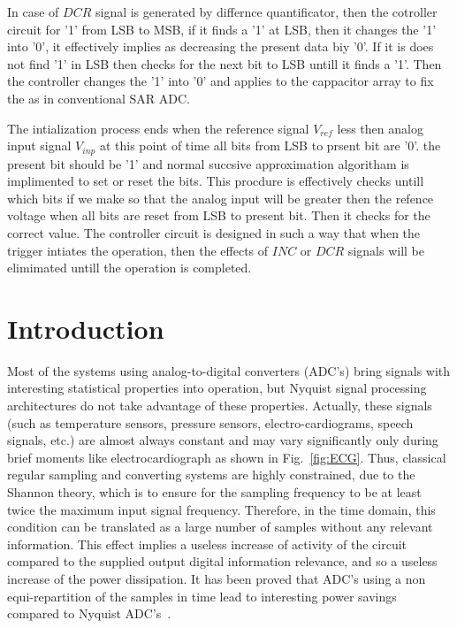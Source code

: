 	In case of $DCR$ signal is generated by differnce quantificator, then the cotroller circuit for '1' from LSB to MSB, if it finds a '1' at LSB, then it changes the '1' into '0', it effectively implies as decreasing the present data biy '0'. If it is does not find '1' in LSB then checks for the next bit to LSB untill it finds a '1'. Then the controller changes the '1' into '0' and applies to the cappacitor array to fix the as in conventional SAR ADC. \par

	The intialization process ends when the reference signal $V_{ref}$ less then analog input signal $V_{inp}$ at this point of time all bits from LSB to prsent bit are '0'. the present bit should be '1' and normal succsive approximation algoritham is implimented to set or reset the bits. This procdure is effectively checks untill which bits if we make so that the analog input will be greater then the refence voltage when all bits are reset from LSB to present bit. Then it checks for the correct value. The controller circuit is designed in such a way that when the trigger intiates the operation, then the effects of $INC$ or $DCR$ signals will be elimimated untill the operation is completed.  \par




\chapter{Introduction}

\par
\hspace{1.2cm} Most of the systems using analog-to-digital converters (ADC's) bring signals with interesting statistical properties into operation, but Nyquist signal processing architectures do not take advantage of these properties. Actually, these signals (such as temperature sensors, pressure sensors, electro-cardiograms, speech signals, etc.) are almost always constant and may vary significantly only during brief moments like electrocardiograph as shown in Fig.~\ref{fig:ECG}. Thus, classical regular sampling and converting systems are highly constrained, due to the Shannon theory, which is to ensure for the sampling frequency to be at least twice the maximum input signal frequency. Therefore, in the time domain, this condition can be translated as a large number of samples without any relevant information. This effect implies a useless increase of activity of the circuit compared to the supplied output digital information relevance, and so a useless increase of the power dissipation. It has been proved that ADC's using a non equi-repartition of the samples in time lead to interesting power savings compared to Nyquist ADC's~\cite{1522735}.

